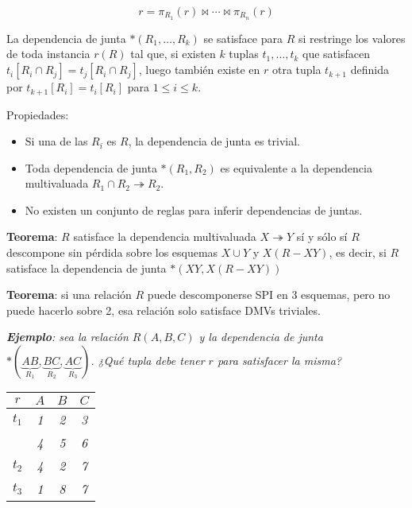 \documentclass[a4paper, twoside]{article}
\begin{document}
\[
r=\pi_{R_{1}}(r)\bowtie\cdots\bowtie\pi_{R_{n}}(r)
\]


La dependencia de junta $*\left(R_{1},\ldots,R_{k}\right)$ se satisface
para $R$ si restringe los valores de toda instancia $r(R)$ tal que,
si existen $k$ tuplas $t_{1},\ldots,t_{k}$ que satisfacen $t_{i}\left[R_{i}\cap R_{j}\right]=t_{j}\left[R_{i}\cap R_{j}\right]$,
luego también existe en $r$ otra tupla $t_{k+1}$ definida por $t_{k+1}\left[R_{i}\right]=t_{i}\left[R_{i}\right]$
para $1\leq i\leq k$.

Propiedades:
\begin{itemize}
\item Si una de las $R_{i}$ es $R$, la dependencia de junta es trivial.
\item Toda dependencia de junta $*(R_{1},R_{2})$ es equivalente a la dependencia
multivaluada $R_{1}\cap R_{2}\twoheadrightarrow R_{2}$.
\item No existen un conjunto de reglas para inferir dependencias de juntas.
\end{itemize}
\textbf{Teorema}: $R$ satisface la dependencia multivaluada $X\twoheadrightarrow Y$
sí y sólo sí $R$ descompone sin pérdida sobre los esquemas $X\cup Y$
y $X(R-XY)$, es decir, si $R$ satisface la dependencia de junta
$*\left(XY,X(R-XY)\right)$

\textbf{Teorema}: si una relación $R$ puede descomponerse SPI en
3 esquemas, pero no puede hacerlo sobre 2, esa relación solo satisface
DMVs triviales.

\textbf{\emph{Ejemplo}}\emph{: sea la relación $R(A,B,C)$ y la dependencia
de junta $*\left(\underset{R_{1}}{\underbrace{AB}},\underset{R_{2}}{\underbrace{BC}},\underset{R_{3}}{\underbrace{AC}}\right)$.
¿Qué tupla debe tener $r$ para satisfacer la misma? }

\noindent \begin{center}
\emph{}%
\begin{tabular}{|c|c|c|c|}
\hline 
$r$ & \emph{$A$} & \emph{$B$} & \emph{$C$}\\
\hline 
\hline 
\emph{$t_{1}$} & \emph{1} & \emph{2} & \emph{3}\\
\hline 
 & \emph{4} & \emph{5} & \emph{6}\\
\hline 
\emph{$t_{2}$} & \emph{4} & \emph{2} & \emph{7}\\
\hline 
\emph{$t_{3}$} & \emph{1} & \emph{8} & \emph{7}\\
\hline 
\end{tabular}
\par\end{center}
\end{document}
